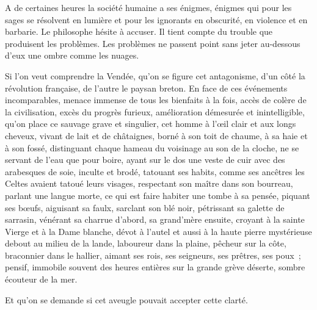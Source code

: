 \documentclass[french,twoside]{book} %
\begin{document}
A de certaines heures la société humaine a ses énigmes, énigmes qui pour les sages se résolvent en lumière et pour les ignorants en obscurité, en violence et en barbarie. Le philosophe hésite à accuser. Il tient compte du trouble que produisent les problèmes.  Les problèmes ne passent point sans jeter au-dessous d’eux une ombre comme les nuages.\par
Si l’on veut comprendre la Vendée, qu’on se figure cet antagonisme, d’un côté la révolution française, de l’autre le paysan breton. En face de ces événements incomparables, menace immense de tous les bienfaits à la fois, accès de colère de la civilisation, excès du progrès furieux, amélioration démesurée et inintelligible, qu’on place ce sauvage grave et singulier, cet homme à l’œil clair et aux longs cheveux, vivant de lait et de châtaignes, borné à son toit de chaume, à sa haie et à son fossé, distinguant chaque hameau du voisinage au son de la cloche, ne se servant de l’eau que pour boire, ayant sur le dos une veste de cuir avec des arabesques de soie, inculte et brodé, tatouant ses habits, comme ses ancêtres les Celtes avaient tatoué leurs visages, respectant son maître dans son bourreau, parlant une langue morte, ce qui est faire habiter une tombe à sa pensée, piquant ses bœufs, aiguisant sa faulx, sarclant son blé noir, pétrissant sa galette de sarrasin, vénérant sa charrue d’abord, sa grand’mère ensuite, croyant à la sainte Vierge et à la Dame blanche, dévot à l’autel et aussi à la haute pierre mystérieuse debout au milieu de la lande, laboureur dans la plaine, pêcheur sur la côte, braconnier dans le hallier, aimant ses rois, ses seigneurs, ses prêtres, ses poux ; pensif, immobile souvent des heures entières sur la grande grève déserte, sombre écouteur de la mer.\par
Et qu’on se demande si cet aveugle pouvait accepter cette clarté.
\end{document}
